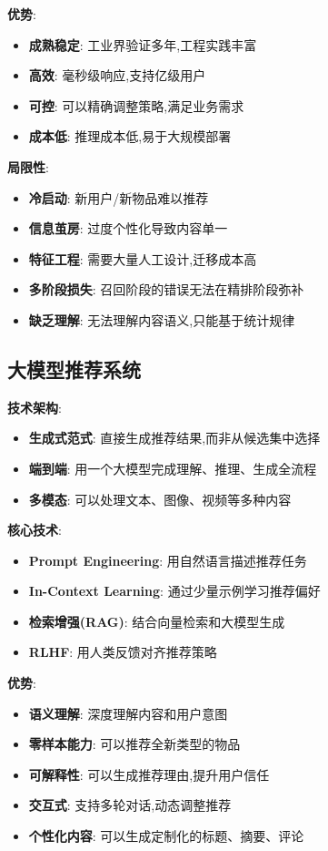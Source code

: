 \documentclass[UTF8]{ctexart}
\begin{document}
\textbf{优势}:
\begin{itemize}
    \item \textbf{成熟稳定}: 工业界验证多年,工程实践丰富
    \item \textbf{高效}: 毫秒级响应,支持亿级用户
    \item \textbf{可控}: 可以精确调整策略,满足业务需求
    \item \textbf{成本低}: 推理成本低,易于大规模部署
\end{itemize}

\textbf{局限性}:
\begin{itemize}
    \item \textbf{冷启动}: 新用户/新物品难以推荐
    \item \textbf{信息茧房}: 过度个性化导致内容单一
    \item \textbf{特征工程}: 需要大量人工设计,迁移成本高
    \item \textbf{多阶段损失}: 召回阶段的错误无法在精排阶段弥补
    \item \textbf{缺乏理解}: 无法理解内容语义,只能基于统计规律
\end{itemize}

\subsection{大模型推荐系统}

\textbf{技术架构}:
\begin{itemize}
    \item \textbf{生成式范式}: 直接生成推荐结果,而非从候选集中选择
    \item \textbf{端到端}: 用一个大模型完成理解、推理、生成全流程
    \item \textbf{多模态}: 可以处理文本、图像、视频等多种内容
\end{itemize}

\textbf{核心技术}:
\begin{itemize}
    \item \textbf{Prompt Engineering}: 用自然语言描述推荐任务
    \item \textbf{In-Context Learning}: 通过少量示例学习推荐偏好
    \item \textbf{检索增强(RAG)}: 结合向量检索和大模型生成
    \item \textbf{RLHF}: 用人类反馈对齐推荐策略
\end{itemize}

\textbf{优势}:
\begin{itemize}
    \item \textbf{语义理解}: 深度理解内容和用户意图
    \item \textbf{零样本能力}: 可以推荐全新类型的物品
    \item \textbf{可解释性}: 可以生成推荐理由,提升用户信任
    \item \textbf{交互式}: 支持多轮对话,动态调整推荐
    \item \textbf{个性化内容}: 可以生成定制化的标题、摘要、评论
\end{itemize}
\end{document}
